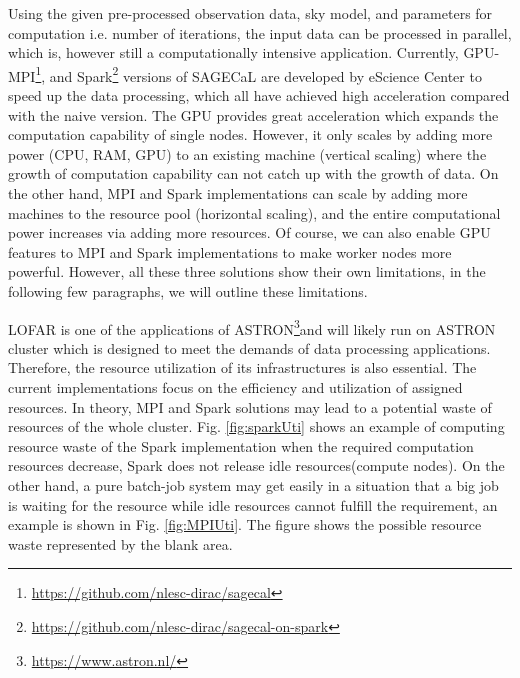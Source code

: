 Using the given pre-processed observation data, sky model, and parameters for computation i.e. number of iterations, the input data can be processed in parallel, which is, however still a computationally intensive application. 
Currently, GPU-MPI\footnote{\url{https://github.com/nlesc-dirac/sagecal}}, and Spark\footnote{\url{https://github.com/nlesc-dirac/sagecal-on-spark}} versions of SAGECaL are developed by eScience Center to speed up the data processing, which all have achieved high acceleration compared with the naive version.
The GPU provides great acceleration which expands the computation capability of single nodes. 
However, it only scales by adding more power (CPU, RAM, GPU) to an existing machine (vertical scaling) where the growth of computation capability can not catch up with the growth of data.
On the other hand, MPI and Spark implementations can scale by adding more machines to the resource pool (horizontal scaling), and the entire computational power increases via adding more resources. 
Of course, we can also enable GPU features to MPI and Spark implementations to make worker nodes more powerful. 
However, all these three solutions show their own limitations, in the following few paragraphs, we will outline these limitations. 

LOFAR is one of the applications of ASTRON\footnote{\url{https://www.astron.nl/}}and will likely run on ASTRON cluster which is designed to meet the demands of data processing applications. 
Therefore, the resource utilization of its infrastructures is also essential. 
The current implementations focus on the efficiency and utilization of assigned resources.  
In theory, MPI and Spark solutions may lead to a potential waste of resources of the whole cluster.
Fig. \ref{fig:sparkUti} shows an example of computing resource waste of the Spark implementation when the required computation resources decrease, Spark does not release idle resources(compute nodes). 
On the other hand, a pure batch-job system may get easily in a situation that a big job is waiting for the resource while idle resources cannot fulfill the requirement, an example is shown in Fig. \ref{fig:MPIUti}. 
The figure shows the possible resource waste represented by the blank area.



